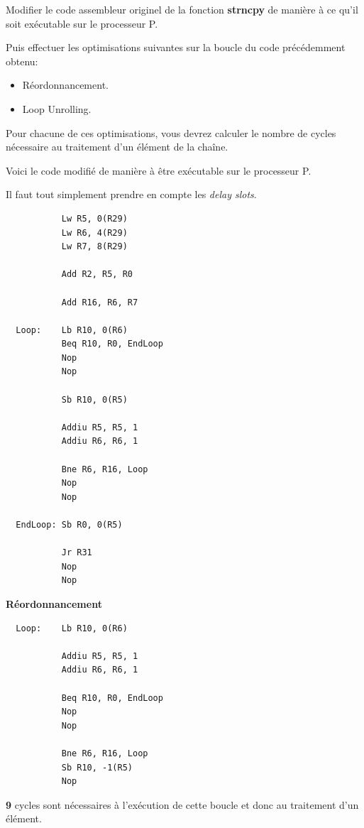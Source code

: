 Modifier le code assembleur originel de la fonction \textbf{strncpy} de
mani\`ere \`a ce qu'il soit ex\'ecutable sur le processeur P.

Puis effectuer les optimisations suivantes sur la boucle du code
pr\'ec\'edemment obtenu:

\begin{itemize}
  \item
    R\'eordonnancement.
  \item
    Loop Unrolling.
\end{itemize}

Pour chacune de ces optimisations, vous devrez calculer le nombre de cycles
n\'ecessaire au traitement d'un \'el\'ement de la cha\^ine.

\begin{correction}

  Voici le code modifi\'e de mani\`ere \`a \^etre ex\'ecutable sur le
  processeur P.

  Il faut tout simplement prendre en compte les \textit{delay slots}.

  \begin{verbatim}
           Lw R5, 0(R29)
           Lw R6, 4(R29)
           Lw R7, 8(R29)

           Add R2, R5, R0

           Add R16, R6, R7

  Loop:    Lb R10, 0(R6)
           Beq R10, R0, EndLoop
           Nop
           Nop

           Sb R10, 0(R5)

           Addiu R5, R5, 1
           Addiu R6, R6, 1

           Bne R6, R16, Loop
           Nop
           Nop

  EndLoop: Sb R0, 0(R5)

           Jr R31
           Nop
           Nop
  \end{verbatim}

  \textbf{R\'eordonnancement}

  \begin{verbatim}
  Loop:    Lb R10, 0(R6)

           Addiu R5, R5, 1
           Addiu R6, R6, 1

           Beq R10, R0, EndLoop
           Nop
           Nop

           Bne R6, R16, Loop
           Sb R10, -1(R5)
           Nop
  \end{verbatim}

  \textbf{9} cycles sont n\'ecessaires \`a l'ex\'ecution de cette boucle et
  donc au traitement d'un \'el\'ement.


\end{correction}
